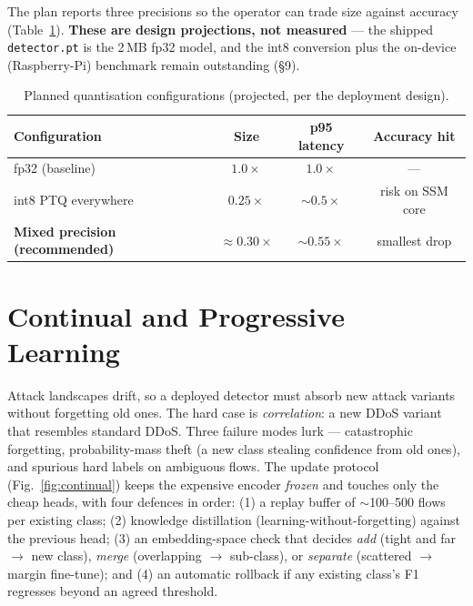 \documentclass[11pt,a4paper]{article}
\begin{document}
The plan reports three precisions so the operator can trade size against accuracy
(Table~\ref{tab:quant}). \textbf{These are design projections, not measured} ---
the shipped \texttt{detector.pt} is the 2\,MB fp32 model, and the int8 conversion
plus the on-device (Raspberry-Pi) benchmark remain outstanding (\S9).

\begin{table}[H]
\centering\small
\caption{Planned quantisation configurations (projected, per the deployment design).}
\label{tab:quant}
\renewcommand{\arraystretch}{1.15}
\begin{tabularx}{0.82\linewidth}{@{}Xccc@{}}
\toprule
\textbf{Configuration} & \textbf{Size} & \textbf{p95 latency} & \textbf{Accuracy hit} \\
\midrule
fp32 (baseline)                        & $1.0\times$          & $1.0\times$        & --- \\
int8 PTQ everywhere                    & $0.25\times$         & ${\sim}0.5\times$  & risk on SSM core \\
\textbf{Mixed precision (recommended)} & $\approx 0.30\times$ & ${\sim}0.55\times$ & smallest drop \\
\bottomrule
\end{tabularx}
\end{table}

\section{Continual and Progressive Learning}

Attack landscapes drift, so a deployed detector must absorb new attack variants
without forgetting old ones. The hard case is \emph{correlation}: a new DDoS
variant that resembles standard DDoS. Three failure modes lurk --- catastrophic
forgetting, probability-mass theft (a new class stealing confidence from old
ones), and spurious hard labels on ambiguous flows. The update protocol
(Fig.~\ref{fig:continual}) keeps the expensive encoder \emph{frozen} and touches
only the cheap heads, with four defences in order: (1) a replay buffer of
$\sim$100--500 flows per existing class; (2) knowledge distillation
(learning-without-forgetting) against the previous head; (3) an embedding-space
check that decides \emph{add} (tight and far $\rightarrow$ new class),
\emph{merge} (overlapping $\rightarrow$ sub-class), or \emph{separate} (scattered
$\rightarrow$ margin fine-tune); and (4) an automatic rollback if any existing
class's F1 regresses beyond an agreed threshold.
\end{document}
